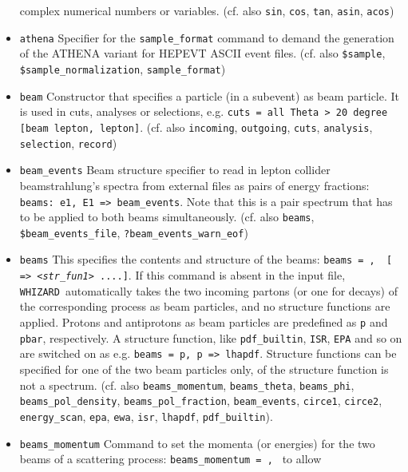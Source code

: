 \documentclass[12pt]{book}
\newcommand{\ttt}[1]{\texttt{#1}}
\newcommand{\whizard}{\ttt{WHIZARD}}
\begin{document}
\begin{itemize}
complex numerical numbers or variables. (cf. also \ttt{sin},
\ttt{cos}, \ttt{tan}, \ttt{asin}, \ttt{acos})
\item
\ttt{athena} \newline
Specifier for the \ttt{sample\_format} command to demand the
generation of the ATHENA variant for HEPEVT ASCII event
files. (cf. also \ttt{\$sample}, \ttt{\$sample\_normalization},
\ttt{sample\_format})
\item
\ttt{beam} \newline
Constructor that specifies a particle (in a subevent) as beam particle. It is
used in cuts, analyses or selections, e.g. \ttt{cuts = all Theta > 20
degree [beam lepton, lepton]}. (cf. also \ttt{incoming}, \ttt{outgoing},
\ttt{cuts}, \ttt{analysis}, \ttt{selection}, \ttt{record})
\item
\ttt{beam\_events} \newline
Beam structure specifier to read in lepton collider beamstrahlung's
spectra from external files as pairs of energy fractions: \ttt{beams:
  e1, E1 => beam\_events}. Note that this is a pair spectrum that has to
be applied to both beams simultaneously. (cf. also \ttt{beams},
\ttt{\$beam\_events\_file}, \ttt{?beam\_events\_warn\_eof})
\item
\ttt{beams} \newline
This specifies the contents and structure of the beams: \ttt{beams =
  {\em <prt1>}, {\em <prt2>} [ => {\em <str\_fun1>} ....]}. If this
command is absent in the input file, \whizard\ automatically takes the
two incoming partons (or one for decays) of the corresponding process
as beam particles, and no structure functions are applied. Protons and
antiprotons as beam particles are predefined as \ttt{p} and
\ttt{pbar}, respectively. A structure function, like \ttt{pdf\_builtin},
\ttt{ISR}, \ttt{EPA} and so on are switched on as e.g. \ttt{beams = p,
p => lhapdf}. Structure functions can be specified for one of the two
beam particles only, of the structure function is not a
spectrum. (cf. also \ttt{beams\_momentum}, \ttt{beams\_theta},
\ttt{beams\_phi}, \ttt{beams\_pol\_density},
\ttt{beams\_pol\_fraction}, \ttt{beam\_events}, \ttt{circe1},
\ttt{circe2}, \ttt{energy\_scan}, \ttt{epa}, \ttt{ewa}, \ttt{isr},
\ttt{lhapdf}, \ttt{pdf\_builtin}).
\item
\ttt{beams\_momentum} \newline
Command to set the momenta (or energies) for the two beams of a
scattering process: \ttt{beams\_momentum = {\em <mom1>}, {\em <mom2>}} to allow

\end{itemize}
\end{document}
